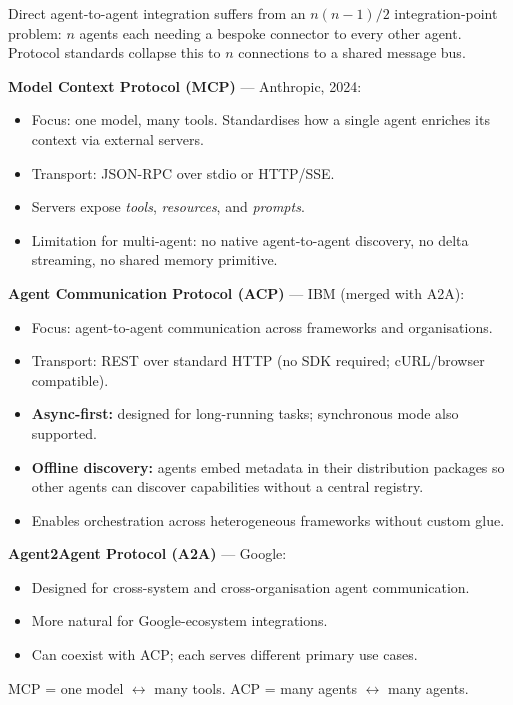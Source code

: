 Direct agent-to-agent integration suffers from an $n(n{-}1)/2$ integration-point
problem: $n$ agents each needing a bespoke connector to every other agent. Protocol
standards collapse this to $n$ connections to a shared message bus.

\textbf{Model Context Protocol (MCP)} --- Anthropic, 2024:
\begin{itemize}
  \item Focus: one model, many tools. Standardises how a single agent enriches its
    context via external servers.
  \item Transport: JSON-RPC over stdio or HTTP/SSE.
  \item Servers expose \emph{tools}, \emph{resources}, and \emph{prompts}.
  \item Limitation for multi-agent: no native agent-to-agent discovery, no delta
    streaming, no shared memory primitive.
\end{itemize}

\textbf{Agent Communication Protocol (ACP)} --- IBM (merged with A2A):
\begin{itemize}
  \item Focus: agent-to-agent communication across frameworks and organisations.
  \item Transport: REST over standard HTTP (no SDK required; cURL/browser compatible).
  \item \textbf{Async-first:} designed for long-running tasks; synchronous mode also
    supported.
  \item \textbf{Offline discovery:} agents embed metadata in their distribution
    packages so other agents can discover capabilities without a central registry.
  \item Enables orchestration across heterogeneous frameworks without custom glue.
\end{itemize}

\textbf{Agent2Agent Protocol (A2A)} --- Google:
\begin{itemize}
  \item Designed for cross-system and cross-organisation agent communication.
  \item More natural for Google-ecosystem integrations.
  \item Can coexist with ACP; each serves different primary use cases.
\end{itemize}

\begin{notebox}[title=MCP vs ACP in one line]
  MCP = one model $\leftrightarrow$ many tools. \quad
  ACP = many agents $\leftrightarrow$ many agents.
\end{notebox}

